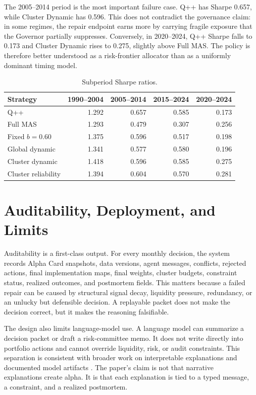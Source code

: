 \documentclass[sigconf,nonacm]{acmart}
\begin{document}
The 2005--2014 period is the most important failure case. Q++ has Sharpe 0.657, while Cluster Dynamic has 0.596. This does not contradict the governance claim: in some regimes, the repair endpoint earns more by carrying fragile exposure that the Governor partially suppresses. Conversely, in 2020--2024, Q++ Sharpe falls to 0.173 and Cluster Dynamic rises to 0.275, slightly above Full MAS. The policy is therefore better understood as a risk-frontier allocator than as a uniformly dominant timing model.

\begin{table}[t]
\centering
\caption{Subperiod Sharpe ratios.}
\label{tab:subperiod}
\scriptsize
\setlength{\tabcolsep}{3.0pt}
\begin{tabular}{lrrrr}
\toprule
Strategy & 1990--2004 & 2005--2014 & 2015--2024 & 2020--2024 \\
\midrule
Q++ & 1.292 & 0.657 & 0.585 & 0.173 \\
Full MAS & 1.293 & 0.479 & 0.307 & 0.256 \\
Fixed \(b=0.60\) & 1.375 & 0.596 & 0.517 & 0.198 \\
Global dynamic & 1.341 & 0.577 & 0.580 & 0.196 \\
Cluster dynamic & 1.418 & 0.596 & 0.585 & 0.275 \\
Cluster reliability & 1.394 & 0.604 & 0.570 & 0.281 \\
\bottomrule
\end{tabular}
\end{table}

\section{Auditability, Deployment, and Limits}

Auditability is a first-class output. For every monthly decision, the system records Alpha Card snapshots, data versions, agent messages, conflicts, rejected actions, final implementation maps, final weights, cluster budgets, constraint status, realized outcomes, and postmortem fields. This matters because a failed repair can be caused by structural signal decay, liquidity pressure, redundancy, or an unlucky but defensible decision. A replayable packet does not make the decision correct, but it makes the reasoning falsifiable.

The design also limits language-model use. A language model can summarize a decision packet or draft a risk-committee memo. It does not write directly into portfolio actions and cannot override liquidity, risk, or audit constraints. This separation is consistent with broader work on interpretable explanations and documented model artifacts \cite{ribeiro2016should,mitchell2019model,gebru2021datasheets}. The paper's claim is not that narrative explanations create alpha. It is that each explanation is tied to a typed message, a constraint, and a realized postmortem.
\end{document}
